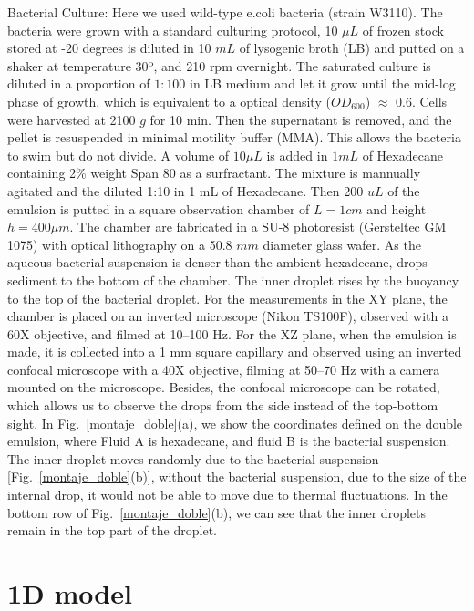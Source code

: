\documentclass[%
10pt,
superscriptaddress,
twocolumn,
 amsmath,amssymb,
 aps,prx,
]{revtex4-2}
\begin{document}
Bacterial Culture:
Here we used wild-type e.coli bacteria (strain  W3110). The bacteria were grown with a standard culturing protocol, 10 $\mu L$ of frozen stock stored at -20 degrees is  diluted  in 10 $mL$ of lysogenic broth (LB) and putted on a shaker at  temperature 30º, and 210 rpm overnight. The saturated culture is diluted in a proportion of $1:100$ in LB medium and let it grow until the mid-log phase of growth, which is equivalent to a optical density ($OD_{600}$) $\approx$ 0.6. Cells were harvested at 2100 $g$ for 10 min. Then the supernatant is removed, and the pellet is resuspended in minimal motility buffer (MMA).  This allows the bacteria to swim but do not divide.  A volume of $10 \mu L$ is added in $1 mL$ of Hexadecane containing 2\% weight Span 80 as a surfractant. The mixture is mannually agitated and the diluted 1:10 in 1 mL of Hexadecane. Then 200 $uL$ of the emulsion is putted in a square observation chamber of $L = 1 cm$  and height $h=400\mu m$. The chamber are fabricated in a SU-8 photoresist (Gersteltec GM 1075) with optical lithography on a 50.8 $mm$ diameter glass wafer.
As the aqueous bacterial suspension is denser than the ambient hexadecane, drops sediment to the bottom of the chamber.
The inner droplet rises by the buoyancy to the top of the bacterial droplet.
For the measurements in the XY plane, the chamber is placed on an inverted microscope (Nikon TS100F), observed with a 60X objective, and filmed at 10--100 Hz.
For the XZ plane, when the emulsion is made, it is collected into a 1 mm square capillary and observed using an inverted confocal microscope with a 40X objective, filming at 50--70 Hz with a camera mounted on the microscope.
Besides, the confocal microscope can be rotated, which allows us to observe the drops from the side instead of the top-bottom sight.
In Fig.~\ref{montaje_doble}(a), we show the coordinates defined on the double emulsion, where Fluid A is hexadecane, and fluid B is the bacterial suspension.
The inner droplet moves randomly due to the bacterial suspension [Fig.~\ref{montaje_doble}(b)], without the bacterial suspension, due to the size of the internal drop, it would not be able to move due to thermal fluctuations.
In the bottom row of Fig.~\ref{montaje_doble}(b), we can see that the inner droplets remain in the top part of the droplet.

\section{1D model}
\end{document}
